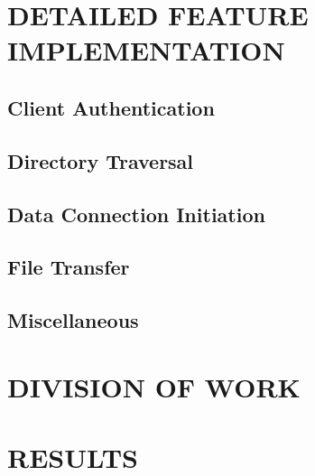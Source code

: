 \documentclass[10pt,twocolumn]{witseiepaper}
\begin{document}
\section{DETAILED FEATURE IMPLEMENTATION} %



\subsection{Client Authentication}

\subsection{Directory Traversal}

\subsection{Data Connection Initiation}

\subsection{File Transfer}

\subsection{Miscellaneous}




\section{DIVISION OF WORK}

\section{RESULTS}\label{results}
\end{document}
